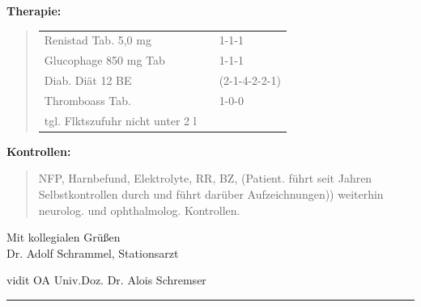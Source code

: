 {{\bfseries Therapie:}

\begin{quote}
\begin{tabular}{lll}
Renistad Tab. 5,0 mg && 1-1-1 
\\
Glucophage 850 mg Tab && 1-1-1 
\\
Diab. Diät 12 BE&&(2-1-4-2-2-1) 
\\
Thromboass Tab.&&1-0-0 
\\
tgl. Flktszufuhr nicht unter 2 l&&
\end{tabular}
\end{quote}




{\bfseries Kontrollen:}

\begin{quote}
  NFP, Harnbefund, Elektrolyte, RR, BZ, (Patient. führt seit
  Jahren Selbstkontrollen durch und führt darüber
  Aufzeichnungen)) weiterhin neurolog. und ophthalmolog.
  Kontrollen.
\end{quote}









Mit kollegialen Grüßen\vspace{2em}\\ Dr. Adolf Schrammel, Stationsarzt


vidit OA Univ.Doz. Dr. Alois Schremser
}

\vspace{2em}

\hrule




